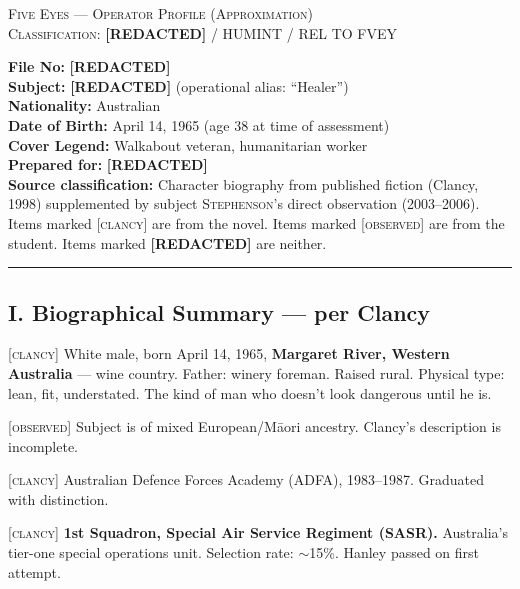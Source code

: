 \vspace{1cm}

\begin{center}
\textsc{Five Eyes --- Operator Profile (Approximation)}\\[0.3em]
\textsc{Classification: \textbf{[REDACTED]} / HUMINT / REL TO FVEY}
\end{center}

\vspace{0.5cm}

\noindent\textbf{File No:} \textbf{[REDACTED]}\\
\textbf{Subject:} \textbf{[REDACTED]} (operational alias: ``Healer'')\\
\textbf{Nationality:} Australian\\
\textbf{Date of Birth:} April 14, 1965 (age 38 at time of assessment)\\
\textbf{Cover Legend:} Walkabout veteran, humanitarian worker\\
\textbf{Prepared for:} \textbf{[REDACTED]}\\
\textbf{Source classification:} Character biography from published fiction (Clancy, 1998) supplemented by subject \textsc{Stephenson}'s direct observation (2003--2006). Items marked \textsc{[clancy]} are from the novel. Items marked \textsc{[observed]} are from the student. Items marked \textbf{[REDACTED]} are neither.

\vspace{1cm}\hrule\vspace{1cm}

\subsection*{I. Biographical Summary --- per Clancy}
\label{interlude:biographical-summary-per-clancy}

\textsc{[clancy]} White male, born April 14, 1965, \textbf{Margaret River, Western Australia} --- wine country. Father: winery foreman. Raised rural. Physical type: lean, fit, understated. The kind of man who doesn't look dangerous until he is.

\textsc{[observed]} Subject is of mixed European/M\={a}ori ancestry. Clancy's description is incomplete.

\textsc{[clancy]} Australian Defence Forces Academy (ADFA), 1983--1987. Graduated with distinction.

\textsc{[clancy]} \textbf{1st Squadron, Special Air Service Regiment (SASR).} Australia's tier-one special operations unit. Selection rate: $\sim$15\%. Hanley passed on first attempt.

